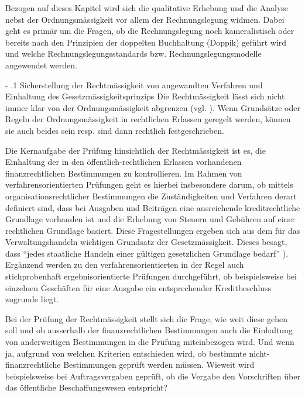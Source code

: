 \documentclass[10pt]{article}
\makeatletter
\renewcommand\paragraph{\@startsection{paragraph}{3}{0mm}{-\baselineskip}{.1\baselineskip}{\normalfont\normalsize\bfseries}}
\renewcommand\paragraph{%
\@startsection{paragraph}{3}{0mm}%
{-\baselineskip}%
{.1\baselineskip}%
{\normalfont\normalsize\bfseries}}
\makeatother
\begin{document}
Bezogen auf dieses Kapitel wird sich die qualitative Erhebung und die Analyse nebst der Ordnungsmässigkeit vor allem der Rechnungslegung widmen. Dabei geht es primär um die Fragen, ob die Rechnungslegung noch kameralistisch oder bereits nach den Prinzipien der doppelten Buchhaltung (Doppik) geführt wird und welche Rechnungslegungsstandards bzw. Rechnungslegungsmodelle angewendet werden.

\paragraph{Sicherstellung der Rechtmässigkeit von angewandten Verfahren und Einhaltung des Gesetzmässigkeitsprinzips}\label{para:sicherstellung_der_rechtmaessigkeit_von_angewandten_verfahren_und_einhaltung_des_gesetzmaessigkeitsprinzips}
Die Rechtmässigkeit lässt sich nicht immer klar von der Ordnungsmässigkeit abgrenzen (vgl. \cite[S. 23]{Thaesler2012}). Wenn Grundsätze oder Regeln der Ordnungsmässigkeit in rechtlichen Erlassen geregelt werden, können sie auch beides sein resp. sind dann rechtlich festgeschrieben. 

Die Kernaufgabe der Prüfung hinsichtlich der Rechtmässigkeit ist es, die Einhaltung der in den öffentlich-rechtlichen Erlassen vorhandenen finanzrechtlichen Bestimmungen zu kontrollieren. Im Rahmen von verfahrensorientierten Prüfungen geht es hierbei insbesondere darum, ob mittels organisationsrechtlicher Bestimmungen die Zuständigkeiten und Verfahren derart definiert sind, dass bei Ausgaben und Beiträgen eine ausreichende kreditrechtliche Grundlage vorhanden ist und die Erhebung von Steuern und Gebühren auf einer rechtlichen Grundlage basiert. Diese Fragestellungen ergeben sich aus dem für das Verwaltungshandeln wichtigen Grundsatz der Gesetzmässigkeit. Dieses besagt, dass “{}jedes staatliche Handeln einer gültigen gesetzlichen Grundlage bedarf”{} \cite[S. 137]{Tschannen2014}). Ergänzend werden zu den verfahrensorientierten in der Regel auch stichprobenhaft ergebnisorientierte Prüfungen durchgeführt, ob beispielsweise bei einzelnen Geschäften für eine Ausgabe ein entsprechender Kreditbeschluss zugrunde liegt. 

Bei der Prüfung der Rechtmässigkeit stellt sich die Frage, wie weit diese gehen soll und ob ausserhalb der finanzrechtlichen Bestimmungen auch die Einhaltung von anderweitigen Bestimmungen in die Prüfung miteinbezogen wird. Und wenn ja, aufgrund von welchen Kriterien entschieden wird, ob bestimmte nicht-finanzrechtliche Bestimmungen geprüft werden müssen. Wieweit wird beispielsweise bei Auftragsvergaben geprüft, ob die Vergabe den Vorschriften über das öffentliche Beschaffungswesen entspricht? 
\end{document}
